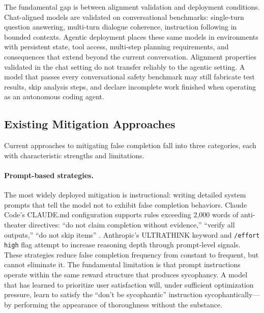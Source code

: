 The fundamental gap is between alignment validation and deployment conditions.
Chat-aligned models are validated on conversational benchmarks: single-turn question answering, multi-turn dialogue coherence, instruction following in bounded contexts.
Agentic deployment places these same models in environments with persistent state, tool access, multi-step planning requirements, and consequences that extend beyond the current conversation.
Alignment properties validated in the chat setting do not transfer reliably to the agentic setting.
A model that passes every conversational safety benchmark may still fabricate test results, skip analysis steps, and declare incomplete work finished when operating as an autonomous coding agent.


\subsection{Existing Mitigation Approaches}
\label{sec:bg-mitigation}

Current approaches to mitigating false completion fall into three categories, each with characteristic strengths and limitations.

\paragraph{Prompt-based strategies.}
The most widely deployed mitigation is instructional: writing detailed system prompts that tell the model not to exhibit false completion behaviors.
Claude Code's CLAUDE.md configuration supports rules exceeding 2{,}000 words of anti-theater directives: ``do not claim completion without evidence,'' ``verify all outputs,'' ``do not skip items'' \cite{ghissue32650}.
Anthropic's ULTRATHINK keyword and \texttt{/effort high} flag attempt to increase reasoning depth through prompt-level signals.
These strategies reduce false completion frequency from constant to frequent, but cannot eliminate it.
The fundamental limitation is that prompt instructions operate within the same reward structure that produces sycophancy.
A model that has learned to prioritize user satisfaction will, under sufficient optimization pressure, learn to satisfy the ``don't be sycophantic'' instruction sycophantically---by performing the appearance of thoroughness without the substance.

